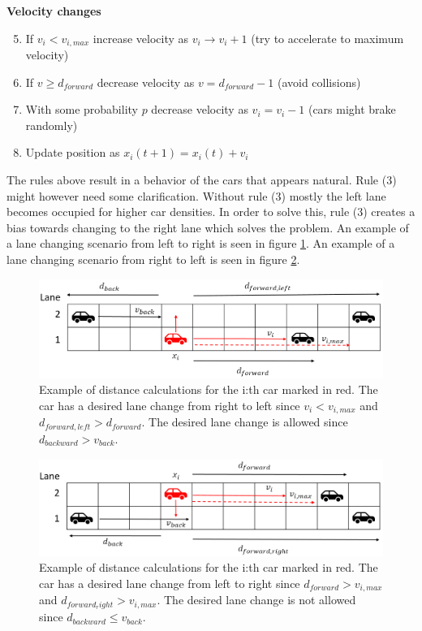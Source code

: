 \documentclass[a4paper,12pt]{article}
\begin{document}
\textbf{Velocity changes}
\begin{enumerate}
    \setcounter{enumi}{4}
    \item If $v_i<v_{i, max}$ increase velocity as $v_i \rightarrow v_i+1$ (try to accelerate to maximum velocity)
    \item If $v \geq d_{forward}$ decrease velocity as $v = d_{forward} - 1$ (avoid collisions)
    \item With some probability $p$ decrease velocity as $v_i=v_i-1$ (cars might brake randomly)
    \item Update position as $x_i(t+1) = x_i(t) + v_i$
\end{enumerate}

The rules above result in a behavior of the cars that appears natural. Rule (3) might however need some
clarification. Without rule (3) mostly the left lane becomes occupied for higher car densities. In order to solve this, rule (3) creates
a bias towards changing to the right lane which solves the problem. An example of a lane changing scenario from left to right is seen in figure
\ref*{left turn}. An example of a lane changing scenario from right to left is seen in figure \ref*{right turn}.

\begin{figure}[H]
    \centering
    \includegraphics[scale=0.6]{Images/left turn.png}
    \caption{Example of distance calculations for the i:th car marked in red. The car has a desired
    lane change from right to left since $v_i < v_{i, max}$ and $d_{forward,left}>d_{forward}$. The desired lane change
    is allowed since $d_{backward} > v_{back}$.}
    \label{left turn}
\end{figure}

\begin{figure}[H]
    \centering
    \includegraphics[scale=0.6]{Images/right turn.png}
    \caption{Example of distance calculations for the i:th car marked in red. The car has a desired
    lane change from left to right since $d_{forward} > v_{i, max}$ and $d_{forward_right}>v_{i, max}$. The desired lane change
    is not allowed since $d_{backward} \leq v_{back}$.}
    \label{right turn}
\end{figure}
\end{document}
